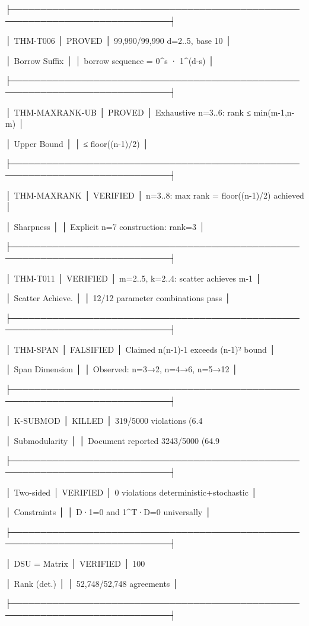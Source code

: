 ├─────────────────────────────────────────────────────────────────────────────┤

│ THM-T006 │ PROVED │ 99,990/99,990 d=2..5, base 10 │

│ Borrow Suffix │ │ borrow sequence = 0^s · 1^(d-s) │

├─────────────────────────────────────────────────────────────────────────────┤

│ THM-MAXRANK-UB │ PROVED │ Exhaustive n=3..6: rank ≤ min(m-1,n-m) │

│ Upper Bound │ │ ≤ floor((n-1)/2) │

├─────────────────────────────────────────────────────────────────────────────┤

│ THM-MAXRANK │ VERIFIED │ n=3..8: max rank = floor((n-1)/2) achieved │

│ Sharpness │ │ Explicit n=7 construction: rank=3 │

├─────────────────────────────────────────────────────────────────────────────┤

│ THM-T011 │ VERIFIED │ m=2..5, k=2..4: scatter achieves m-1 │

│ Scatter Achieve. │ │ 12/12 parameter combinations pass │

├─────────────────────────────────────────────────────────────────────────────┤

│ THM-SPAN │ FALSIFIED │ Claimed n(n-1)-1 exceeds (n-1)² bound │

│ Span Dimension │ │ Observed: n=3→2, n=4→6, n=5→12 │

├─────────────────────────────────────────────────────────────────────────────┤

│ K-SUBMOD │ KILLED │ 319/5000 violations (6.4%

│ Submodularity │ │ Document reported 3243/5000 (64.9%

├─────────────────────────────────────────────────────────────────────────────┤

│ Two-sided │ VERIFIED │ 0 violations deterministic+stochastic │

│ Constraints │ │ D·1=0 and 1^T·D=0 universally │

├─────────────────────────────────────────────────────────────────────────────┤

│ DSU = Matrix │ VERIFIED │ 100%

│ Rank (det.) │ │ 52,748/52,748 agreements │

├─────────────────────────────────────────────────────────────────────────────┤

